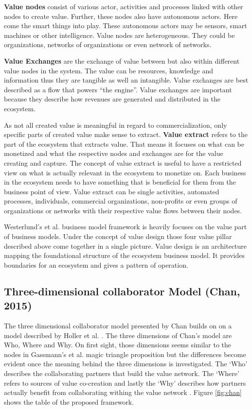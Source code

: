 		\textbf{Value nodes} consist of various actor, activities and processes linked with other nodes to create value. Further, these nodes also have autonomous actors. Here come the smart things into play. These autonomous actors may be sensors, smart machines or other intelligence. Value nodes are heterogeneous. They could be organizations, networks of organizations or even network of networks.

		\textbf{Value Exchanges} are the exchange of value between but also within different value nodes in the system. The value can be resources, knowledge and information thus they are tangible as well an intangible. Value exchanges are best described as a flow that powers ``the engine''. Value exchanges are important because they describe how revenues are generated and distributed in the ecosystem.

		As not all created value is meaningful in regard to commercialization, only specific parts of created value make sense to extract. \textbf{Value extract} refers to the part of the ecosystem that extracts value. That means it focuses on what can be monetized and what the respective nodes and exchanges are for the value creating and capture. The concept of value extract is useful to have a restricted view on what is actually relevant in the ecosystem to monetize on. Each business in the ecosystem needs to have something that is beneficial for them from the business point of view. Value extract can be single activities, automated processes, individuals, commercial organizations, non-profits or even groups of organizations or networks with their respective value flows between their nodes.

		Westerlund's et al. business model framework is heavily focuses on the value part of business models. Under the concept of value design those four value pillar described above come together in a single picture. Value design is an architecture mapping the foundational structure of the ecosystem business model. It provides boundaries for an ecosystem and gives a pattern of operation.

	\subsection{Three-dimensional collaborator Model (Chan, 2015)}

		The three dimensional collaborator model presented by Chan \cite{chan} builds on on a model described by Holler et al. \cite{holler}. The three dimensions of Chan's model are Who, Where and Why. On first sight, those dimensions seems similar to the nodes in Gassmann's et al. magic triangle proposition but the differences become evident once the meaning behind the three dimensions is investigated. The `Who' describes the collaborating partners that build the value network. The `Where' refers to sources of value co-creation and lastly the `Why' describes how partners actually benefit from collaborating withing the value network \cite{chan}. Figure \ref{fig:chan} shows the table of the proposed framework.

